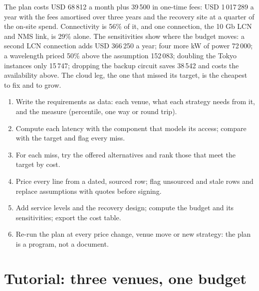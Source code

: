The plan costs USD 68\,812 a month plus 39\,500 in one-time fees: USD 1\,017\,289 a year with the fees amortised over three years and the
recovery site at a quarter of the on-site spend. Connectivity is 56\% of it, and one connection, the 10 Gb LCN and NMS link, is 29\%
alone. The sensitivities show where the budget moves: a second LCN connection adds USD 366\,250 a year; four more kW of power 72\,000; a
wavelength priced 50\% above the assumption 152\,083; doubling the Tokyo instances only 15\,747; dropping the backup circuit saves 38\,542
and costs the availability above. The cloud leg, the one that missed its target, is the cheapest to fix and to grow.

\begin{method}\label{met:nw:build-a-connectivity-plan:method}
\begin{enumerate}
\item Write the requirements as data: each venue, what each strategy needs from it, and the measure (percentile, one way or round trip).
\item Compute each latency with the component that models its access; compare with the target and flag every miss.
\item For each miss, try the offered alternatives and rank those that meet the target by cost.
\item Price every line from a dated, sourced row; flag unsourced and stale rows and replace assumptions with quotes before signing.
\item Add service levels and the recovery design; compute the budget and its sensitivities; export the cost table.
\item Re-run the plan at every price change, venue move or new strategy: the plan is a program, not a document.
\end{enumerate}
\end{method}

\section{Tutorial: three venues, one budget}\label{tut:nw:build-a-connectivity-plan:tut}

